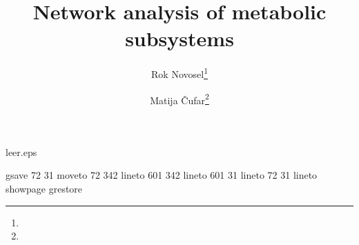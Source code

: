 \begin{filecontents}{leer.eps}

gsave
72 31 moveto
72 342 lineto
601 342 lineto
601 31 lineto
72 31 lineto
showpage
grestore
\end{filecontents}
%
\documentclass[epj]{svjour}
%
\usepackage{graphicx}
\usepackage{epstopdf}
\usepackage[utf8]{inputenc}
%

%
\title{Network analysis of metabolic subsystems}
\author{Rok Novosel\thanks{} \and Matija
  Čufar\thanks{}
}                     %
%
%
%


\maketitle

\section{Introduction}
\label{sec:intro}

Since the turn of the century, life sciences have been evolving
rapidly. Advances in data acquisition, storage and analysis technology have
allowed scientist to gather immense amounts of data and build complex models
from it~\cite{modsys}. These complicated models have brought people of various
backgrounds, such as physics, mathematics and computer science into the field
of biology.

